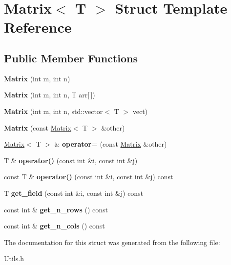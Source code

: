 \hypertarget{structMatrix}{}\section{Matrix$<$ T $>$ Struct Template Reference}
\label{structMatrix}
\subsection*{Public Member Functions}
\begin{DoxyCompactItemize}
\item 
\mbox{\label{structMatrix_ab214150a26c19a3f66fba2a7dab86d04}} 
{\bfseries Matrix} (int m, int n)
\item 
\mbox{\label{structMatrix_a235ed010302613a018fffc144f3e6fc6}} 
{\bfseries Matrix} (int m, int n, T arr\mbox{[}$\,$\mbox{]})
\item 
\mbox{\label{structMatrix_ae68125e7246979d0f2103cef913c3135}} 
{\bfseries Matrix} (int m, int n, std\+::vector$<$ T $>$ vect)
\item 
\mbox{\label{structMatrix_a1012080b9cf91044d58c11f5a49c8230}} 
{\bfseries Matrix} (const \hyperlink{structMatrix}{Matrix}$<$ T $>$ \&other)
\item 
\mbox{\label{structMatrix_ab688e0d1d2c4ad2cb04262f3a056d902}} 
\hyperlink{structMatrix}{Matrix}$<$ T $>$ \& {\bfseries operator=} (const \hyperlink{structMatrix}{Matrix} \&other)
\item 
\mbox{\label{structMatrix_a1a09c4488e6db5901b7f6c5de327d8bf}} 
T \& {\bfseries operator()} (const int \&i, const int \&j)
\item 
\mbox{\label{structMatrix_ac4d46c6bf2be24bf4bcea7ae47c5e814}} 
const T \& {\bfseries operator()} (const int \&i, const int \&j) const
\item 
\mbox{\label{structMatrix_adb3acce57a0e471129700f61479322eb}} 
T {\bfseries get\+\_\+field} (const int \&i, const int \&j) const
\item 
\mbox{\label{structMatrix_a9aaa59e7e0355a6d2eeed105f5314b72}} 
const int \& {\bfseries get\+\_\+n\+\_\+rows} () const
\item 
\mbox{\label{structMatrix_acf8cc1fcc08d41a9eb68055b5feb99b4}} 
const int \& {\bfseries get\+\_\+n\+\_\+cols} () const
\end{DoxyCompactItemize}


The documentation for this struct was generated from the following file\+:\begin{DoxyCompactItemize}
\item 
Utils.\+h\end{DoxyCompactItemize}
